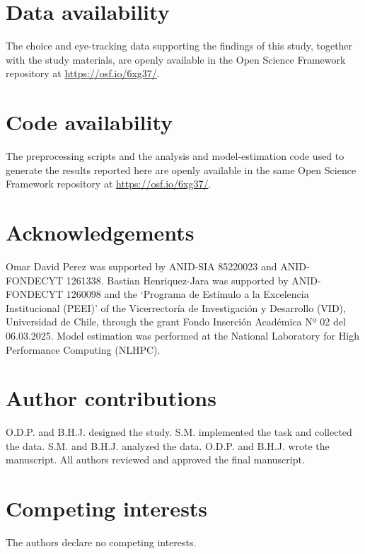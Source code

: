 \documentclass[man,natbib,floatsintext]{apa7}
\begin{document}
\section{Data availability}

The choice and eye-tracking data supporting the findings of this study, together with the study materials, are openly available in the Open Science Framework repository at \url{https://osf.io/6xg37/}.

\section{Code availability}

The preprocessing scripts and the analysis and model-estimation code used to generate the results reported here are openly available in the same Open Science Framework repository at \url{https://osf.io/6xg37/}.

\section{Acknowledgements}

Omar David Perez was supported by ANID-SIA 85220023 and ANID-FONDECYT 1261338. Bastian Henriquez-Jara was supported by ANID-FONDECYT 1260098 and the `Programa de Estímulo a la Excelencia Institucional (PEEI)' of the Vicerrectoría de Investigación y Desarrollo (VID), Universidad de Chile, through the grant Fondo Inserción Académica Nº 02 del 06.03.2025. Model estimation was performed at the National Laboratory for High Performance Computing (NLHPC).

\section{Author contributions}

O.D.P. and B.H.J. designed the study. S.M. implemented the task and collected the data. S.M. and B.H.J. analyzed the data. O.D.P. and B.H.J. wrote the manuscript. All authors reviewed and approved the final manuscript.

\section{Competing interests}

The authors declare no competing interests.



\end{document}
